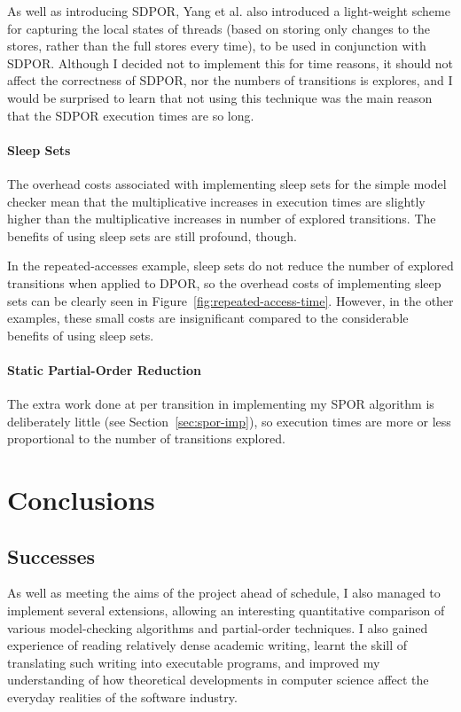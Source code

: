 \documentclass[12pt,a4paper,twoside,openright]{report}
\begin{document}
As well as introducing SDPOR, Yang et al.\@
also introduced a light-weight
scheme for capturing the local states of
threads (based on storing only changes
to the stores, rather than the full stores
every time), to be used in conjunction with
SDPOR. Although I decided not to
implement this for time reasons,
it should not affect the correctness
of SDPOR, nor the numbers of transitions
is explores, and I would be surprised
to learn that not using this technique
was the main reason that the SDPOR
execution times are so long. 

\subsubsection{Sleep Sets}
The overhead costs associated with implementing
sleep sets for the simple model checker
mean that the multiplicative
increases in execution times are slightly
higher than the multiplicative increases
in number of explored transitions. The
benefits of using sleep sets are still
profound, though.

In the repeated-accesses example,
sleep sets do not reduce the number
of explored transitions when applied
to DPOR, so the overhead costs of
implementing sleep sets can be clearly
seen in Figure~\ref{fig:repeated-access-time}.
However, in the other examples, these
small costs are insignificant compared
to the considerable benefits of using sleep
sets.

\subsubsection{Static Partial-Order Reduction}
The extra work done at per transition
in implementing my SPOR
algorithm is deliberately little
(see Section~\ref{sec:spor-imp}), so
execution times are more or less proportional
to the number of transitions explored.

\chapter{Conclusions}

\section{Successes}

As well as meeting the aims of the
project ahead of schedule, I also
managed to implement several
extensions, allowing an
interesting quantitative
comparison of various
model-checking algorithms
and partial-order techniques.
I also gained experience of
reading relatively dense academic
writing, learnt the skill of
translating such writing into
executable programs, and
improved my understanding
of how theoretical developments
in computer science affect the
everyday realities of the
software industry.
\end{document}

